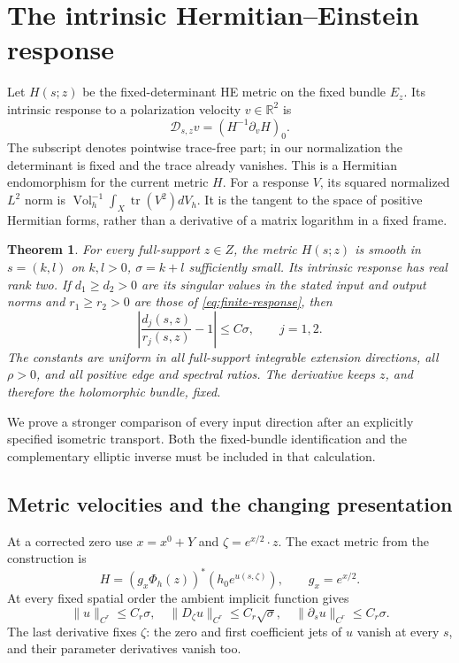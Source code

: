 \documentclass[11pt]{amsart}
\newtheorem{theorem}{Theorem}[section]
\theoremstyle{definition}
\theoremstyle{remark}
\newcommand{\RR}{\mathbb R}
\newcommand{\tr}{\operatorname{tr}}
\newcommand{\Vol}{\operatorname{Vol}}
\newcommand{\cD}{\mathscr D}
\begin{document}
\section{The intrinsic Hermitian--Einstein response}\label{sec:intrinsic-response}

Let $H(s;z)$ be the fixed-determinant HE metric on the fixed bundle $E_z$.
Its intrinsic response to a polarization velocity $v\in\RR^2$ is
\begin{equation}\label{eq:intrinsic-response}
 \cD_{s,z}v=(H^{-1}\partial_vH)_0.
\end{equation}
The subscript denotes pointwise trace-free part; in our normalization the
determinant is fixed and the trace already vanishes. This is a Hermitian
endomorphism for the current metric $H$. For a response $V$, its squared normalized
$L^2$ norm is $\Vol_h^{-1}\int_X\tr(V^2)dV_h$. It is the tangent to the
space of positive Hermitian forms, rather than a derivative of a matrix
logarithm in a fixed frame.

\begin{theorem}\label{thm:response}
For every full-support $z\in Z$, the metric $H(s;z)$ is smooth in
$s=(k,l)$ on $k,l>0$, $\sigma=k+l$ sufficiently small. Its intrinsic
response has real rank two. If $d_1\ge d_2>0$ are its singular values
in the stated input and output norms and $r_1\ge r_2>0$ are those of
\eqref{eq:finite-response}, then
\begin{equation}\label{eq:response-singular-values}
 \left|\frac{d_j(s,z)}{r_j(s,z)}-1\right|\le C\sigma,
 \qquad j=1,2.
\end{equation}
The constants are uniform in all full-support integrable extension
directions, all $\rho>0$, and all positive edge and spectral ratios.
The derivative keeps $z$, and therefore the holomorphic bundle, fixed.
\end{theorem}

We prove a stronger comparison of every input direction after an explicitly
specified isometric transport. Both the fixed-bundle identification and the
complementary elliptic inverse must be included in that calculation.

\subsection{Metric velocities and the changing presentation}
At a corrected zero use $x=x^0+Y$ and $\zeta=e^{x/2}\cdot z$.
The exact metric from the construction is
\begin{equation}\label{eq:response-metric}
 H=(g_x\Phi_h(z))^*(h_0e^{u(s,\zeta)}),\qquad g_x=e^{x/2}.
\end{equation}
At every fixed spatial order the ambient implicit function gives
\begin{equation}\label{eq:u-derivatives}
 \|u\|_{C^r}\le C_r\sigma,\quad
 \|D_\zeta u\|_{C^r}\le C_r\sqrt\sigma,\quad
 \|\partial_su\|_{C^r}\le C_r\sigma.
\end{equation}
The last derivative fixes $\zeta$: the zero and first coefficient jets
of $u$ vanish at every $s$, and their parameter derivatives vanish too.
\end{document}

